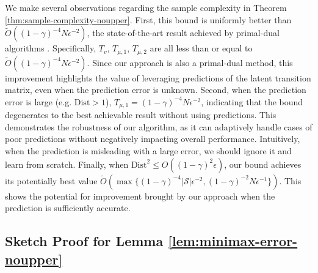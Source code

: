 \documentclass[12pt]{article}
\begin{document}
We make several observations regarding the sample complexity in Theorem \ref{thm:sample-complexity-noupper}. First, this bound is uniformly better than $\tilde{O}((1-\gamma)^{-4}N\epsilon^{-2})$, the state-of-the-art result achieved by primal-dual algorithms \cite{jin2020efficiently}. Specifically, $T_{v}$, $T_{\mu,1}$, $T_{\mu,2}$ are all \textcolor{black}{less} than or equal to $\tilde{O}((1-\gamma)^{-4}N\epsilon^{-2})$. Since our approach is also a primal-dual method, this improvement highlights the value of leveraging predictions of the latent transition matrix, even when the prediction error is unknown. Second, when the prediction error is large (e.g. $\text{Dist} > 1$), 
$T_{\mu,1} = (1-\gamma)^{-4}N\epsilon^{-2}$, indicating that the bound degenerates to the best achievable result without using predictions. This demonstrates the robustness of our algorithm, as it can adaptively handle cases of poor predictions without negatively impacting overall performance. Intuitively, when the prediction is misleading with a large error, we should ignore it and learn from scratch. Finally, when $\text{Dist}^2 \le O((1-\gamma)^2\epsilon)$, our bound achieves its potentially best value $\tilde{O}(\max\{(1-\gamma)^{-4} |\mathcal{S}| \epsilon^{-2},(1-\gamma)^{-2} N \epsilon^{-1}\})$. This shows the potential for improvement brought by our approach when the prediction is sufficiently accurate.


\subsection{Sketch Proof for Lemma \ref{lem:minimax-error-noupper}}

\label{sec:alg-noupper-sketch-proof-minimax}
\end{document}
